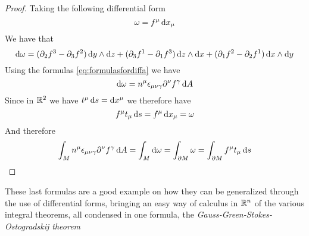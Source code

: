 \documentclass[../complete.tex]{subfiles}
\begin{document}
\begin{proof}
	Taking the following differential form
	\begin{equation*}
		\omega=f^\mu\operatorname{d\!} x_\mu
	\end{equation*}
	We have that
	\begin{equation*}
		\operatorname{d\!}\omega=(\partial_2f^3-\partial_3f^2)\operatorname{d\!} y\wedge\operatorname{d\!} z+(\partial_3f^1-\partial_1f^3)\operatorname{d\!} z\wedge\operatorname{d\!} x+(\partial_1f^2-\partial_2f^1)\operatorname{d\!} x\wedge\operatorname{d\!} y
	\end{equation*}
	Using the formulas \eqref{eq:formulasfordiffa} we have
	\begin{equation*}
		\operatorname{d\!}\omega=n^\mu\epsilon_{\mu\nu\gamma}\partial^\nu f^\gamma\operatorname{d\!} A
	\end{equation*}
	Since in $\mathbb{R}^2$ we have $t^\mu\operatorname{d\!} s=\operatorname{d\!} x^\mu$ we therefore have
	\begin{equation*}
		f^\mu t_\mu\operatorname{d\!} s=f^\mu\operatorname{d\!} x_\mu=\omega
	\end{equation*}
	And therefore
	\begin{equation*}
		\int_Mn^\mu\epsilon_{\mu\nu\gamma}\partial^\nu f^\gamma\operatorname{d\!} A=\int_M\operatorname{d\!}\omega=\int_{\partial M}\omega=\int_{\partial M}f^\mu t_\mu\operatorname{d\!} s
	\end{equation*}
\end{proof}
These last formulas are a good example on how they can be generalized through the use of differential forms, bringing an easy way of calculus in $\mathbb{R}^n$ of the various integral theorems, all condensed in one formula, the \textit{Gauss-Green-Stokes-Ostogradskij theorem}
\end{document}
